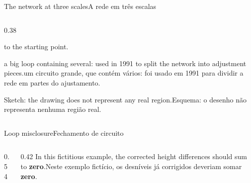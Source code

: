 \documentclass[aspectratio=169,11pt]{beamer}
\newcommand{\tr}[2]{\ifEN#2\else#1\fi}
\newcommand{\bnum}[1]{\ifmmode\textcolor{mTeal}{\mathbf{#1}}\else\textbf{\textcolor{mTeal}{#1}}\fi}
\begin{document}
\begin{frame}{\tr{A rede em três escalas}{The network at three scales}}
\begin{columns}[T]
\begin{column}{0.38\textwidth}
\begin{description}
{              to the starting point.}
        \item[\textcolor{corSist}{\textbf{\tr{macrocircuito}{macro-loop}}}] \tr{um circuito
              grande, que contém vários: foi usado em 1991 para dividir a rede em partes do
              ajustamento.}{a big loop containing several: used in 1991 to split the network
              into adjustment pieces.}
      \end{description}
      \smallskip
      {\tiny\tr{Esquema: o desenho não representa nenhuma região real.}{Sketch: the drawing
      does not represent any real region.}}
    \end{column}
  \end{columns}
\end{frame}

\begin{frame}{\tr{Fechamento de circuito}{Loop misclosure}}
  \begin{columns}[T]
    \begin{column}{0.54\textwidth}
      \centering
    \end{column}
    \begin{column}{0.42\textwidth}
      \footnotesize
      \tr{Neste exemplo fictício, os desníveis já corrigidos deveriam somar
      \bnum{zero}.}{In this fictitious example, the corrected height differences
      should sum to \bnum{zero}.}
      \medskip


\end{column}
\end{columns}
\end{frame}
\end{document}

